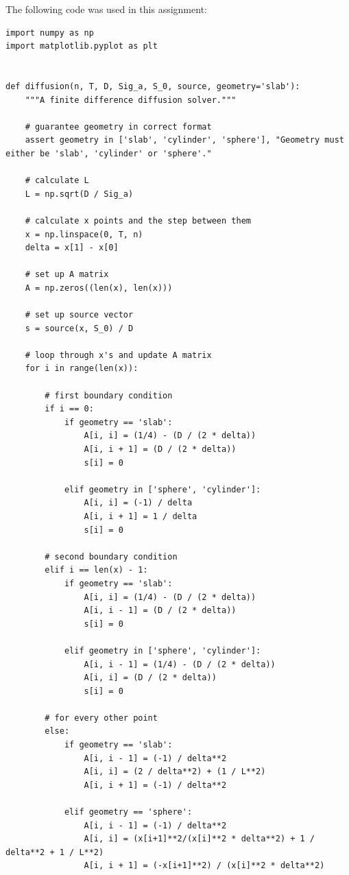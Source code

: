 \documentclass{amsart}
\theoremstyle{definition}
\begin{document}
 
\newpage
The following code was used in this assignment:

\begin{verbatim}
import numpy as np
import matplotlib.pyplot as plt


def diffusion(n, T, D, Sig_a, S_0, source, geometry='slab'):
    """A finite difference diffusion solver."""

    # guarantee geometry in correct format
    assert geometry in ['slab', 'cylinder', 'sphere'], "Geometry must either be 'slab', 'cylinder' or 'sphere'."

    # calculate L
    L = np.sqrt(D / Sig_a)

    # calculate x points and the step between them
    x = np.linspace(0, T, n)
    delta = x[1] - x[0]

    # set up A matrix
    A = np.zeros((len(x), len(x)))

    # set up source vector
    s = source(x, S_0) / D

    # loop through x's and update A matrix
    for i in range(len(x)):

        # first boundary condition
        if i == 0:
            if geometry == 'slab':
                A[i, i] = (1/4) - (D / (2 * delta))
                A[i, i + 1] = (D / (2 * delta))
                s[i] = 0

            elif geometry in ['sphere', 'cylinder']:
                A[i, i] = (-1) / delta
                A[i, i + 1] = 1 / delta
                s[i] = 0

        # second boundary condition
        elif i == len(x) - 1:
            if geometry == 'slab':
                A[i, i] = (1/4) - (D / (2 * delta))
                A[i, i - 1] = (D / (2 * delta))
                s[i] = 0

            elif geometry in ['sphere', 'cylinder']:
                A[i, i - 1] = (1/4) - (D / (2 * delta))
                A[i, i] = (D / (2 * delta))
                s[i] = 0

        # for every other point
        else:
            if geometry == 'slab':
                A[i, i - 1] = (-1) / delta**2
                A[i, i] = (2 / delta**2) + (1 / L**2)
                A[i, i + 1] = (-1) / delta**2

            elif geometry == 'sphere':
                A[i, i - 1] = (-1) / delta**2
                A[i, i] = (x[i+1]**2/(x[i]**2 * delta**2) + 1 / delta**2 + 1 / L**2)
                A[i, i + 1] = (-x[i+1]**2) / (x[i]**2 * delta**2)


\end{verbatim}
\end{document}
